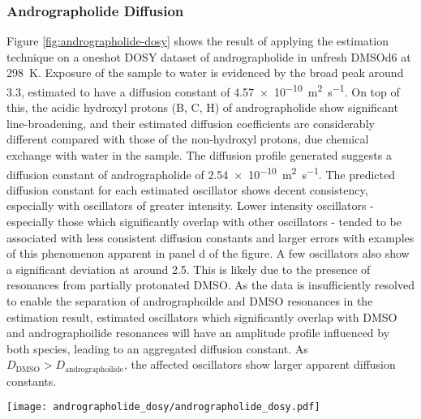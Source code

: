 \subsubsection{Andrographolide Diffusion}
Figure \ref{fig:andrographolide-dosy} shows the result of applying the
estimation technique on a oneshot \ac{DOSY} dataset of andrographolide in
unfresh \acs{DMSOd6} at \qty{298}{\kelvin}. Exposure of the sample to water is
evidenced by the broad
peak around \qty{3.3}{\partspermillion}, estimated to have a diffusion constant
of \qty{4.57e-10}{\meter\squared\per\second}. On top of this, the acidic
hydroxyl protons (B, C, H) of andrographolide show significant line-broadening,
and their estimated diffusion coefficients are considerably different compared
with those of the non-hydroxyl protons, due chemical exchange with water in the
sample\cite{Chen1998}.
The diffusion profile generated suggests a diffusion constant of andrographolide of
\qty{2.54e-10}{\meter\squared\per\second}. The predicted diffusion constant for
each estimated oscillator shows decent consistency, especially with oscillators
of greater intensity. Lower intensity oscillators - especially those which
significantly overlap with other oscillators - tended to be associated with
less consistent diffusion constants and larger errors with examples of this
phenomenon apparent in panel d of the figure. A few oscillators also show a
significant deviation at around \qty{2.5}{\partspermillion}. This is likely due to
the presence of resonances from partially protonated \acs{DMSO}. As the data is
insufficiently resolved to enable the separation of andrographoilde and
\ac{DMSO} resonances in the estimation result, estimated oscillators which
significantly overlap with \acs{DMSO} and andrographoilide resonances will have
an amplitude profile influenced by both species, leading to an aggregated
diffusion constant. As $D_{\text{DMSO}} > D_{\text{andrographoilide}}$, the
affected oscillators show larger apparent diffusion constants.


\begin{sidewaysfigure}
    \centering
    \texttt{[image: andrographolide\_dosy/andrographolide\_dosy.pdf]}
    \caption[
        Result of estimating a Oneshot \acs{DOSY} dataset of andrographolide.
    ]{
        Result of estimating a Oneshot \ac{DOSY} dataset of andrographolide in
        unfresh \ac{DMSOd6}.
        \textbf{a.} \ac{1D} spectrum.
        \textbf{b.} Diffusion profile obtained by summing the contour plot in
        c. along the $x$-axis.
        \textbf{c.} Contour plot mapping estimated oscillators to diffusion constants, with
        $p_{\text{min}} = \qty{2e-10}{\meter\squared\per\second}$,
        $p_{\text{max}} = \qty{5e-10}{\meter\squared\per\second}$,
        $c = 2.5$,
        $R=128$.
        \textbf{d.} Magnified view of the \SIrange{2}{1.6}{\partspermillion}
        spectral range, with estimated oscillator peaks plotted.
    }
    \label{fig:andrographolide-dosy}
\end{sidewaysfigure}

